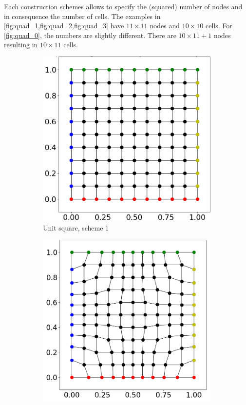 Each construction schemes allows to specify the (squared) number of nodes and in consequence the number of cells. The examples in \cref{fig:quad_1,fig:quad_2,fig:quad_3} have $11 \times 11$ nodes and $10 \times 10$ cells. For \cref{fig:quad_0}, the numbers are slightly different. There are $10 \times 11 + 1$ nodes resulting in $10 \times 11$ cells.

\begin{figure}%
  \centering%
  \begin{subfigure}[t]{0.48\textwidth}%
    \centering%
    \includegraphics[width=\textwidth]{images/fiber_creation/quad_1.png}%
    \caption{Unit square, scheme 1}%
    \label{fig:quad_1}%
  \end{subfigure}
  \quad
  \begin{subfigure}[t]{0.48\textwidth}%
    \centering%
    \includegraphics[width=\textwidth]{images/fiber_creation/quad_2.png}%

\end{subfigure}
\end{figure}
